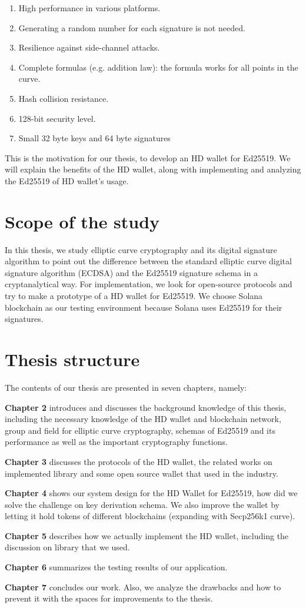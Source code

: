 \begin{enumerate}
    \item High performance in various platforms.
    \item Generating a random number for each signature is not needed.
    \item Resilience against side-channel attacks.
    \item Complete formulas (e.g. addition law): the formula works for all points in the curve.
    \item Hash collision resistance.
    \item 128-bit security level.
    \item Small 32 byte keys and 64 byte signatures
\end{enumerate}
This is the motivation for our thesis, to develop an HD wallet for Ed25519. We will explain the benefits of the HD wallet, along with implementing and analyzing the Ed25519 of HD wallet’s usage. 

\section{Scope of the study}

In this thesis, we study elliptic curve cryptography and its digital signature algorithm to point out the difference between the standard elliptic curve digital signature algorithm (ECDSA) and the Ed25519 signature schema in a cryptanalytical way. For implementation, we look for open-source protocols and try to make a prototype of a HD wallet for Ed25519. We choose Solana blockchain as our testing environment because Solana uses Ed25519 for their signatures.

\section{Thesis structure}

The contents of our thesis are presented in seven chapters, namely:

\textbf{Chapter 2} introduces and discusses the background knowledge of this thesis, including the necessary knowledge of the HD wallet and blockchain network, group and field for elliptic curve cryptography, schemas of Ed25519 and its performance as well as the important cryptography functions.

\textbf{Chapter 3} discusses the protocols of the HD wallet, the related works on implemented library and some open source wallet that used in the industry. 

\textbf{Chapter 4} shows our system design for the HD Wallet for Ed25519, how did we solve the challenge on key derivation schema. We also improve the wallet by letting it hold tokens of different blockchains (expanding with Secp256k1 curve).

\textbf{Chapter 5} describes how we actually implement the HD wallet, including the discussion on library that we used.

\textbf{Chapter 6} summarizes the testing results of our application.

\textbf{Chapter 7} concludes our work. Also, we analyze the drawbacks and how to prevent it with the spaces for improvements to the thesis.
